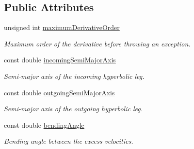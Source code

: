 \subsection*{Public Attributes}
\begin{DoxyCompactItemize}
\item 
unsigned int \hyperlink{structtudat_1_1unit__tests_1_1TestFunctionWithLargeRootDifference_adfdeccc9a1b18cd9e256e61d23112813}{maximum\+Derivative\+Order}\hypertarget{structtudat_1_1unit__tests_1_1TestFunctionWithLargeRootDifference_adfdeccc9a1b18cd9e256e61d23112813}{}\label{structtudat_1_1unit__tests_1_1TestFunctionWithLargeRootDifference_adfdeccc9a1b18cd9e256e61d23112813}

\begin{DoxyCompactList}\small\item\em Maximum order of the derivative before throwing an exception. \end{DoxyCompactList}\item 
const double \hyperlink{structtudat_1_1unit__tests_1_1TestFunctionWithLargeRootDifference_ac2afcad3b8a80b175e2f3d7959c0328a}{incoming\+Semi\+Major\+Axis}\hypertarget{structtudat_1_1unit__tests_1_1TestFunctionWithLargeRootDifference_ac2afcad3b8a80b175e2f3d7959c0328a}{}\label{structtudat_1_1unit__tests_1_1TestFunctionWithLargeRootDifference_ac2afcad3b8a80b175e2f3d7959c0328a}

\begin{DoxyCompactList}\small\item\em Semi-\/major axis of the incoming hyperbolic leg. \end{DoxyCompactList}\item 
const double \hyperlink{structtudat_1_1unit__tests_1_1TestFunctionWithLargeRootDifference_ab7d1b1123bb014feb851b4eda566ed18}{outgoing\+Semi\+Major\+Axis}\hypertarget{structtudat_1_1unit__tests_1_1TestFunctionWithLargeRootDifference_ab7d1b1123bb014feb851b4eda566ed18}{}\label{structtudat_1_1unit__tests_1_1TestFunctionWithLargeRootDifference_ab7d1b1123bb014feb851b4eda566ed18}

\begin{DoxyCompactList}\small\item\em Semi-\/major axis of the outgoing hyperbolic leg. \end{DoxyCompactList}\item 
const double \hyperlink{structtudat_1_1unit__tests_1_1TestFunctionWithLargeRootDifference_a33d3c168ba55604dde7df63e6b211321}{bending\+Angle}\hypertarget{structtudat_1_1unit__tests_1_1TestFunctionWithLargeRootDifference_a33d3c168ba55604dde7df63e6b211321}{}\label{structtudat_1_1unit__tests_1_1TestFunctionWithLargeRootDifference_a33d3c168ba55604dde7df63e6b211321}

\begin{DoxyCompactList}\small\item\em Bending angle between the excess velocities. \end{DoxyCompactList}\end{DoxyCompactItemize}
